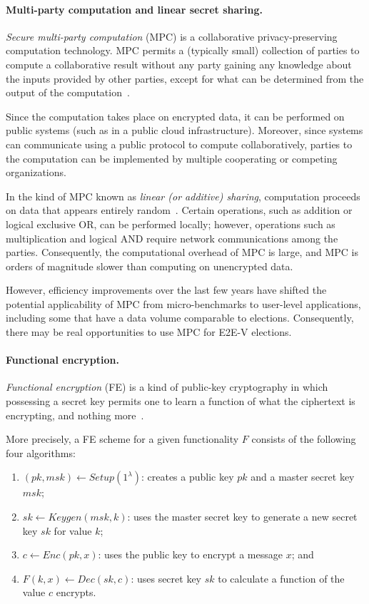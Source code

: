 \paragraph{Multi-party computation and linear secret sharing.}
\emph{Secure multi-party computation} (MPC) is a collaborative
privacy-preserving computation technology. MPC permits a (typically
small) collection of parties to compute a collaborative result without
any party gaining any knowledge about the inputs provided by other
parties, except for what can be determined from the output of the
computation~\cite{chaum1988multiparty, goldwasser1987play}.

Since the computation takes place on encrypted data, it can be
performed on public systems (such as in a public cloud
infrastructure). Moreover, since systems can communicate using a
public protocol to compute collaboratively, parties to the computation
can be implemented by multiple cooperating or competing organizations.

In the kind of MPC known as \emph{linear (or additive) sharing},
computation proceeds on data that appears entirely
random~\cite{Cramer00}. Certain operations, such as addition or
logical exclusive OR, can be performed locally; however, operations
such as multiplication and logical AND require network communications
among the parties. Consequently, the computational overhead of MPC is
large, and MPC is orders of magnitude slower than computing on
unencrypted data.

However, efficiency improvements over the last few years have shifted
the potential applicability of MPC from micro-benchmarks to user-level
applications, including some that have a data volume comparable to
elections. Consequently, there may be real opportunities to use MPC
for E2E-V elections.

\paragraph{Functional encryption.} \emph{Functional encryption} (FE)
is a kind of public-key cryptography in which possessing a secret key
permits one to learn a function of what the ciphertext is encrypting,
and nothing more~\cite{boneh2011functional}.

More precisely, a FE scheme for a given functionality $F$ consists of
the following four algorithms:
\begin{enumerate}
\item $(pk, msk) \leftarrow Setup(1^\lambda)$: creates a public key
  $pk$ and a master secret key $msk$;
\item $sk \leftarrow Keygen(msk, k)$: uses the master secret key to
  generate a new secret key $sk$ for value $k$;
\item $c \leftarrow Enc(pk, x)$: uses the public key to encrypt a
  message $x$; and \item $F(k, x) \leftarrow Dec(sk, c)$: uses secret
  key $sk$ to calculate a function of the value $c$ encrypts.
\end{enumerate}

